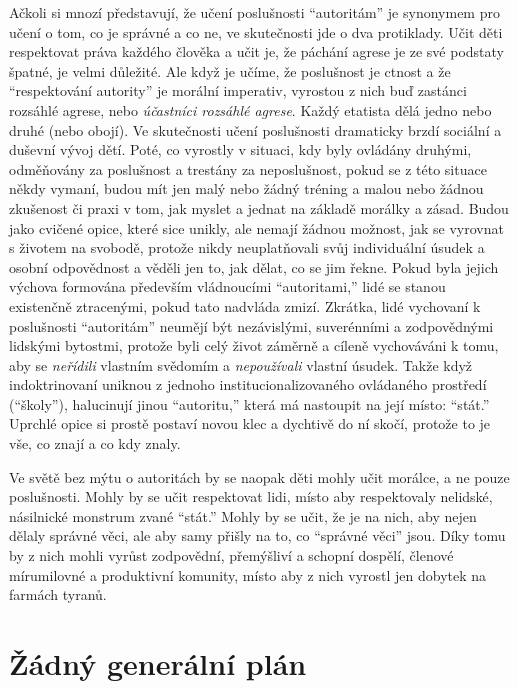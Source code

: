 \documentclass{book}
\begin{document}
Ačkoli si mnozí představují, že učení poslušnosti \enquote{autoritám} je synonymem pro učení o tom, co je správné a co ne, ve skutečnosti jde o dva protiklady. Učit děti respektovat práva každého člověka a učit je, že páchání agrese je ze své podstaty špatné, je velmi důležité. Ale když je učíme, že poslušnost je ctnost a že \enquote{respektování autority} je morální imperativ, vyrostou z nich buď zastánci rozsáhlé agrese, nebo \emph{účastníci rozsáhlé agrese}. Každý etatista dělá jedno nebo druhé (nebo obojí). Ve skutečnosti učení poslušnosti dramaticky brzdí sociální a duševní vývoj dětí. Poté, co vyrostly v situaci, kdy byly ovládány druhými, odměňovány za poslušnost a trestány za neposlušnost, pokud se z této situace někdy vymaní, budou mít jen malý nebo žádný tréning a malou nebo žádnou zkušenost či praxi v tom, jak myslet a jednat na základě morálky a zásad. Budou jako cvičené opice, které sice unikly, ale nemají žádnou možnost, jak se vyrovnat s životem na svobodě, protože nikdy neuplatňovali svůj individuální úsudek a osobní odpovědnost a věděli jen to, jak dělat, co se jim řekne. Pokud byla jejich výchova formována především vládnoucími \enquote{autoritami,} lidé se stanou existenčně ztracenými, pokud tato nadvláda zmizí. Zkrátka, lidé vychovaní k poslušnosti \enquote{autoritám} neumějí být nezávislými, suverénními a zodpovědnými lidskými bytostmi, protože byli celý život záměrně a cíleně vychováváni k tomu, aby se \emph{neřídili} vlastním svědomím a \emph{nepoužívali} vlastní úsudek. Takže když indoktrinovaní uniknou z jednoho institucionalizovaného ovládaného prostředí (\enquote{školy}), halucinují jinou \enquote{autoritu,} která má nastoupit na její místo: \enquote{stát.} Uprchlé opice si prostě postaví novou klec a dychtivě do ní skočí, protože to je vše, co znají a co kdy znaly.

Ve světě bez mýtu o autoritách by se naopak děti mohly učit morálce, a ne pouze poslušnosti. Mohly by se učit respektovat lidi, místo aby respektovaly nelidské, násilnické monstrum zvané \enquote{stát.} Mohly by se učit, že je na nich, aby nejen dělaly správné věci, ale aby samy přišly na to, co \enquote{správné věci} jsou. Díky tomu by z nich mohli vyrůst zodpovědní, přemýšliví a schopní dospělí, členové mírumilovné a produktivní komunity, místo aby z nich vyrostl jen dobytek na farmách tyranů.

\section{Žádný generální plán}
\end{document}
